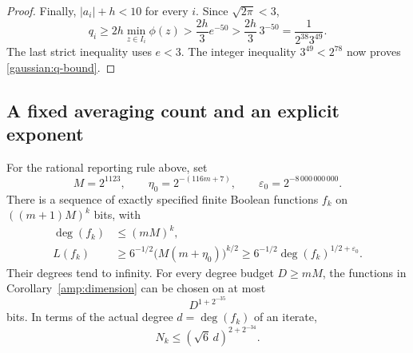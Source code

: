 \begin{proof}
Finally, $|a_i|+h<10$ for every $i$.  Since $\sqrt{2\pi}<3$,
\[
 q_i\ge2h\min_{z\in I_i}\phi(z)
 >\frac{2h}{3}e^{-50}
 >\frac{2h}{3}\,3^{-50}
 =\frac1{2^{38}3^{49}}.
\]
The last strict inequality uses $e<3$.  The integer inequality
$3^{49}<2^{78}$ now proves \eqref{gaussian:q-bound}.
\end{proof}

\subsection{A fixed averaging count and an explicit exponent}

\begin{theorem}
\label{gaussian:explicit}
For the rational reporting rule above, set
\begin{equation}
 M=2^{1123},\qquad
 \eta_0=2^{-(116m+7)},\qquad
 \varepsilon_0=2^{-8\,000\,000\,000}.
 \label{gaussian:numerical-choices}
\end{equation}
There is a sequence of exactly specified finite Boolean functions $f_k$
on $((m+1)M)^k$ bits, with
\begin{equation}
 \begin{aligned}
 \deg(f_k)&\le(mM)^k,\\
 L(f_k)&\ge6^{-1/2}\bigl(M(m+\eta_0)\bigr)^{k/2}
       \ge6^{-1/2}\deg(f_k)^{1/2+\varepsilon_0}.
 \end{aligned}
 \label{gaussian:explicit-growth}
\end{equation}
Their degrees tend to infinity.  For every degree budget $D\ge mM$,
the functions in Corollary~\ref{amp:dimension} can be chosen on at most
\begin{equation}
 D^{1+2^{-35}}
 \label{gaussian:budget-dimension}
\end{equation}
bits.  In terms of the actual degree $d=\deg(f_k)$ of an iterate,
\begin{equation}
 N_k\le(\sqrt6\,d)^{2+2^{-34}}.
 \label{gaussian:actual-dimension}
\end{equation}
\end{theorem}

